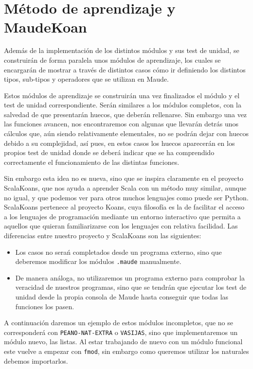 \section{Método de aprendizaje y MaudeKoan}

Además de la implementación de los distintos módulos y sus test de unidad, se construirán de forma paralela unos módulos de aprendizaje, los cuales se encargarán de mostrar a través de distintos casos cómo ir definiendo los distintos tipos, sub-tipos y operadores que se utilizan en Maude.\par

Estos módulos de aprendizaje se construirán una vez finalizados el módulo y el test de unidad correspondiente. Serán similares a los módulos completos, con la salvedad de que presentarán huecos, que deberán rellenarse. Sin embargo una vez las funciones avancen, nos encontraremos con algunas que llevarán detrás unos cálculos que, aún siendo relativamente elementales, no se podrán dejar con huecos debido a su complejidad, así pues, en estos casos los huecos aparecerán en los propios test de unidad donde se deberá indicar que se ha comprendido correctamente el funcionamiento de las distintas funciones. \par

Sin embargo esta idea no es nueva, sino que se inspira claramente en el proyecto ScalaKoans, que nos ayuda a aprender Scala con un método muy similar, aunque no igual, y que podemos ver para otros muchos lenguajes como puede ser Python. ScalaKoans pertenece al proyecto Koans, cuya filosofía es la de facilitar el acceso a los lenguajes de programación mediante un entorno interactivo que permita a aquellos que quieran familiarizarse con los lenguajes con relativa facilidad. Las diferencias entre nuestro proyecto y ScalaKoans son las siguientes:\par
\begin{itemize}
\item Los casos no serań completados desde un programa externo, sino que deberemos modificar los módulos \texttt{.maude} manualmente.
\item De manera análoga, no utilizaremos un programa externo para comprobar la veracidad de nuestros programas, sino que se tendrán que ejecutar los test de unidad desde la propia consola de Maude hasta conseguir que todas las funciones los pasen.
\end{itemize}
 A continuación daremos un ejemplo de estos módulos incompletos, que no se corresponderá con \texttt{PEANO-NAT-EXTRA} o \texttt{VASIJAS}, sino que implementaremos un módulo nuevo, las listas. Al estar trabajando de nuevo con un módulo funcional este vuelve a empezar con \verb"fmod", sin embargo como queremos utilizar los naturales debemos importarlos. \par

